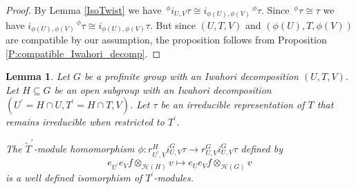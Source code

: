 \documentclass[10pt, letterpaper]{amsart}
\theoremstyle{plain}
\newtheorem{Lem}[equation]{Lemma}
\theoremstyle{definition}
\numberwithin{equation}{section}
\newcommand{\Tt}{\widetilde{T}}
\begin{document}
\begin{proof}
	By Lemma \ref{IsoTwist} we have $\,^{\phi}i_{U,V}\tau\cong i_{\phi(U),\phi(V)}\,^{\phi}\tau$. Since $\,^{\phi}\tau\cong \tau$ we have $i_{\phi(U),\phi(V)}\,^{\phi}\tau\cong i_{\phi(U),\phi(V)}\tau$. But since $(U, T, V)$ and  $(\phi(U),T,\phi(V))$ are compatible by our assumption, the proposition follows from Proposition \ref{P:compatible_Iwahori_decomp}.
\end{proof}

\begin{Lem}\label{L:IndRes2x}
    Let $G$ be a profinite group with an Iwahori decomposition $(U,T,V)$. Let $H\subseteq G$ be an open subgroup with an Iwahori decomposition $(U^{\prime}=H\cap U,T^{\prime}=H\cap T,V)$. Let $\tau$ be an irreducible representation of $T$ that remains irreducible when restricted to $T^{\prime}$.
    
    The $\Tt^{\prime}$-module homomorphism $\phi:r_{U^{\prime},V}^{H}i_{U,V}^{G}\tau\rightarrow r_{U,V}^{G}i_{U,V}^{G}\tau$ defined by
    \begin{equation*}
        e_{U^{\prime}}e_{V}f\otimes_{\mathcal{H}(H)} v \mapsto e_{U}e_{V}f\otimes_{\mathcal{H}(G)} v
    \end{equation*}
    is a well defined isomorphism of $T^{\prime}$-modules.
\end{Lem}  
\end{document}
